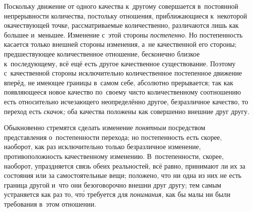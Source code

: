 Поскольку движение от одного качества к~другому совершается в~постоянной
непрерывности количества, постольку отношения, приближающиеся к~некоторой
окачествующей точке, рассматриваемые количественно, различаются лишь как
большее и~меньшее. Изменение с~этой стороны {\em постепенно}. Но постепенность
касается только внешней стороны изменения, а~не качественной его стороны;
предшествующее количественное отношение, бесконечно близкое к~последующему,
всё ещё есть другое качественное существование. Поэтому с~качественной стороны
исключительно количественное постепенное движение вперёд, не имеющее границы
в~самом себе, абсолютно прерывается; так как появляющееся новое качество
по~своему чисто количественному соотношению есть относительно исчезающего
неопределённо другое, безразличное качество, то переход есть {\em скачок;}
оба качества положены как совершенно внешние друг другу.

Обыкновенно стремятся сделать изменение {\em понятным} посредством
представления о~постепенности перехода; но постепенность есть скорее, наоборот,
как раз исключительно только безразличное изменение, противоположность
качественному изменению. В~постепенности, скорее, наоборот, упраздняется связь
обеих реальностей, всё равно, принимают ли их за состояния или за
самостоятельные вещи; положено, что ни одна из них не есть граница другой и~что
они безоговорочно внешни друг другу; тем самым устраняется как раз то, чт\'{о}
требуется для {\em понимания,} как бы малы ни были требования в~этом отношении.


